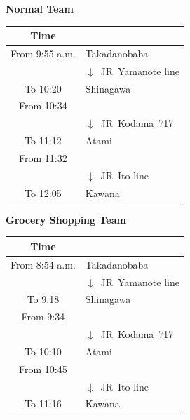 \documentclass[unicode,a4paper,11pt]{ltjsarticle}
\begin{document}
\begin{center}
  \begin{minipage}[ht]{0.48\columnwidth}
    \textbf{Normal Team}

    \vspace*{5pt}

    \begin{tabular}{cl}\hline
      Time           &                                 \\ \hline
      From 9:55 a.m. & Takadanobaba                    \\
                     & $\downarrow$\ JR\ Yamanote line \\
      To 10:20       & Shinagawa                       \\
      From 10:34     &                                 \\
                     & $\downarrow$\ JR\ Kodama\ 717   \\
      To 11:12       & Atami                           \\
      From 11:32     &                                 \\
                     & $\downarrow$\ JR\ Ito line      \\
      To 12:05       & Kawana                          \\ \hline
    \end{tabular}
  \end{minipage}
  \begin{minipage}[ht]{0.48\columnwidth}
    \textbf{Grocery Shopping Team}

    \vspace*{5pt}

    \begin{tabular}{cl}\hline
      Time           &                                 \\ \hline
      From 8:54 a.m. & Takadanobaba                    \\
                     & $\downarrow$\ JR\ Yamanote line \\
      To 9:18        & Shinagawa                       \\
      From 9:34      &                                 \\
                     & $\downarrow$\ JR\ Kodama\ 717   \\
      To 10:10       & Atami                           \\
      From 10:45     &                                 \\
                     & $\downarrow$\ JR\ Ito line      \\
      To 11:16       & Kawana                          \\ \hline
    \end{tabular}
  \end{minipage}
\end{center}
\end{document}
